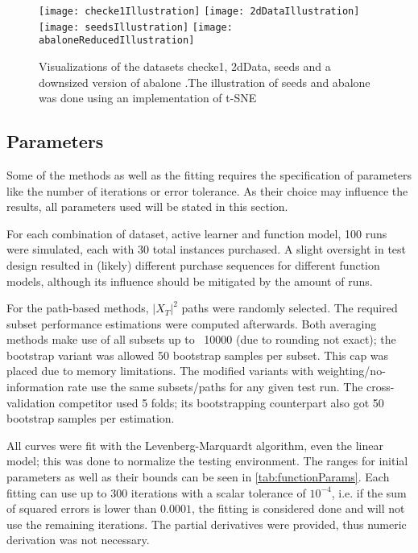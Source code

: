 \begin{figure}[h]
	\centering
	\texttt{[image: checke1Illustration]}
	\texttt{[image: 2dDataIllustration]}
	\texttt{[image: seedsIllustration]}
	\texttt{[image: abaloneReducedIllustration]}
	\caption{Visualizations of the datasets checke1, 2dData, seeds and a downsized version of abalone \cite{Chapelle2005,KremplEtAl2014,CharytanowiczEtAl2010,NashEtAl1994}.\newline The illustration of seeds and abalone was done using an implementation of t-SNE \cite{vanDerMaaten2008}}
	\label{fig:datasetIllustrations}
\end{figure}

\subsection{Parameters}

Some of the methods as well as the fitting requires the specification of parameters like the number of iterations or error tolerance. As their choice may influence the results, all parameters used will be stated in this section.

For each combination of dataset, active learner and function model, 100 runs were simulated, each with 30 total instances purchased. A slight oversight in test design resulted in (likely) different purchase sequences for different function models, although its influence should be mitigated by the amount of runs.

For the path-based methods, $|X_T|^2$ paths were randomly selected. The required subset performance estimations were computed afterwards. Both averaging methods make use of all subsets up to ~10000 (due to rounding not exact); the bootstrap variant was allowed 50 bootstrap samples per subset. This cap was placed due to memory limitations. The modified variants with weighting/no-information rate use the same subsets/paths for any given test run. The cross-validation competitor used 5 folds; its bootstrapping counterpart also got 50 bootstrap samples per estimation.

All curves were fit with the Levenberg-Marquardt algorithm, even the linear model; this was done to normalize the testing environment. The ranges for initial parameters as well as their bounds can be seen in \ref{tab:functionParams}. Each fitting can use up to 300 iterations with a scalar tolerance of $10^{-4}$, i.e. if the sum of squared errors is lower than $0.0001$, the fitting is considered done and will not use the remaining iterations. The partial derivatives were provided, thus numeric derivation was not necessary.

